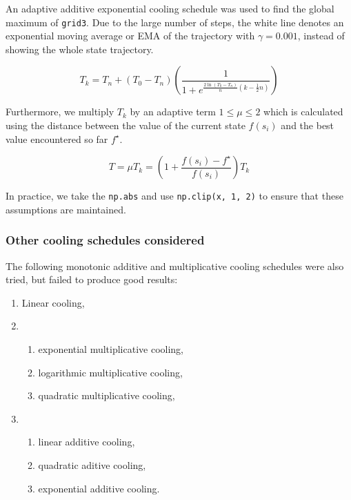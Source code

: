 \documentclass[11pt,oneside]{article}
\begin{document}
An adaptive additive exponential cooling schedule was used to find the global maximum 
of \texttt{grid3}. Due to the large number of steps, the white line denotes an
exponential moving average or EMA of the trajectory with $\gamma=0.001$, instead of
showing the whole state trajectory.

\begin{equation}
    T_k = T_n + (T_0 - T_n)
    \left(\frac{1}{1+e^{\frac{2\ln\left(T_0-T_n\right)}{n}
    \left(k-\frac{1}{2}n\right)}}\right)
\end{equation}

Furthermore, we multiply $T_k$ by an adaptive term $1 \leq \mu \leq 2$ which
is calculated using the distance between the value of the current state $f(s_i)$ and
the best value encountered so far $f^\star$.

\begin{equation}
    T = \mu T_k =
    \left( 1 + \frac{f(s_i)-f^\star}{f(s_i)}\right)T_k
\end{equation}

In practice, we take the \texttt{np.abs} and use \texttt{np.clip(x, 1, 2)}
to ensure that these assumptions are maintained.

\subsubsection{Other cooling schedules considered}

 The following monotonic additive and multiplicative
cooling schedules were also tried, but failed to produce good results:

\begin{enumerate}
    \item Linear cooling,
    \item 
    \begin{enumerate}
        \item exponential multiplicative cooling,
        \item logarithmic multiplicative cooling,
        \item quadratic multiplicative cooling,
    \end{enumerate}
    \item
        \begin{enumerate}
            \item linear additive cooling,
            \item quadratic aditive cooling,
            \item exponential additive cooling.
        \end{enumerate}
\end{enumerate}
\end{document}
